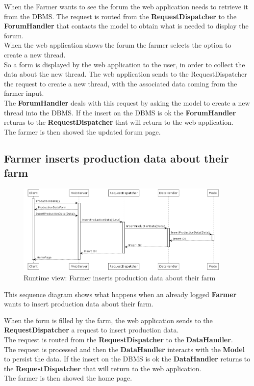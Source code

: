 \documentclass[10pt]{report}
\begin{document}
When the Farmer wants to see the forum the web application needs to retrieve it from the DBMS. The request is routed from the \textbf{RequestDispatcher} to the \textbf{ForumHandler} that contacts the model to obtain what is needed to display the forum.\\ When the web application shows the forum the farmer selects the option to create a new thread.\\
So a form is displayed by the web application to the user, in order to collect the data about the new thread. The web application sends to the RequestDispatcher the request to create a new thread, with the associated data coming from the farmer input. \\The \textbf{ForumHandler} deals with this request by asking the model to create a new thread into the DBMS. If the insert on the DBMS is ok the \textbf{ForumHandler} returns to the \textbf{RequestDispatcher} that will return to the web application.\\ The farmer is then showed the updated forum page.


\subsection{Farmer inserts production data about their farm}
\begin{figure}[H]
    \centering
    \includegraphics[width=400px]{SequenceDiagram/Farmer_1_9.png}
    \caption{Runtime view: Farmer inserts production data about their farm}
\end{figure}
This sequence diagram shows what happens when an already logged \textbf{Farmer} wants to insert production data about their farm.

When the form is filled by the farm, the web application sends to the \textbf{RequestDispatcher} a request to insert production data.\\ The request is routed from the \textbf{RequestDispatcher} to the \textbf{DataHandler}.\\ The request is processed and then the \textbf{DataHandler} interacts with the \textbf{Model} to persist the data. If the insert on the DBMS is ok the \textbf{DataHandler} returns to the \textbf{RequestDispatcher} that will return to the web application.\\ The farmer is then showed the home page.
\end{document}

